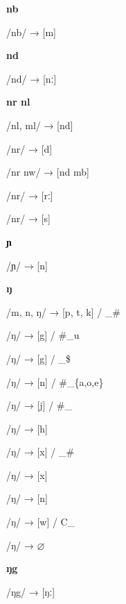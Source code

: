 \begin{center}\textbf{nb}\end{center}
\begin{multicols}{4}
\noindent /nb/ → [m]
\end{multicols}


\begin{center}\textbf{nd}\end{center}
\begin{multicols}{4}
\noindent /nd/ → [nː]
\end{multicols}

\begin{center}\textbf{nr nl}\end{center}
\begin{multicols}{4}
\noindent /nl, ml/ → [nd]

\noindent /nr/ → [d]

\noindent /nr nw/ → [nd mb]

\noindent /nr/ → [rː]

\noindent /nr/ → [s]
\end{multicols}


\begin{center}\textbf{ɲ}\end{center}
\begin{multicols}{4}
\noindent /ɲ/ → [n]
\end{multicols}


\begin{center}\textbf{ŋ}\end{center}
\begin{multicols}{4}
\noindent /m, n, ŋ/ → [p, t, k] / \_\#

\noindent /ŋ/ → [g] / \#\_u

\noindent /ŋ/ → [g] / \_\$

\noindent /ŋ/ → [n] / \#\_\{a,o,e\}

\noindent /ŋ/ → [j] / \#\_

\noindent /ŋ/ → [h]

\noindent /ŋ/ → [x] / \_\#

\noindent /ŋ/ → [x]

\noindent /ŋ/ → [n]

\noindent /ŋ/ → [w] / C\_

\noindent /ŋ/ → $\varnothing$
\end{multicols}


\begin{center}\textbf{ŋg}\end{center}
\begin{multicols}{4}
\noindent /ŋg/ → [ŋː]
\end{multicols}


